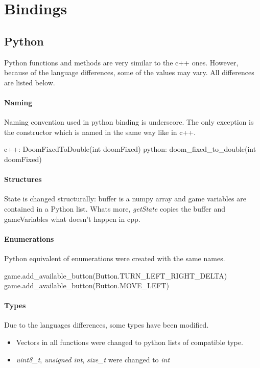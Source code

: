 \documentclass[english,bachelor,a4paper,twoside]{ppfcmthesis}
\begin{document}
\section{Bindings}
\subsection{Python}

Python functions and methods are very similar to the c++ ones. However, because of the language differences, some of the values may vary. All differences are listed below.

\paragraph {Naming}
Naming convention used in python binding is underscore. The only exception is the constructor which is named in the same way like in c++.

\begin{cblock}
c++: DoomFixedToDouble(int doomFixed)
python: doom_fixed_to_double(int doomFixed)
\end{cblock}


\paragraph {Structures}
 State is changed structurally: buffer is a numpy array and game variables are contained in a Python list. Whats more, \emph{getState} copies the buffer and gameVariables what doesn't happen in cpp. 
\paragraph {Enumerations}
Python equivalent of enumerations were created with the same names.
\begin{cblock}
game.add_available_button(Button.TURN_LEFT_RIGHT_DELTA)
game.add_available_button(Button.MOVE_LEFT)
\end{cblock}
\paragraph {Types}
Due to the languages differences, some types have been modified.
\begin{itemize} 
\item Vectors in all functions were changed to python lists of compatible type.

\item  \emph{uint8\_t}, \emph{unsigned int}, \emph{size\_t} were changed to \emph{int}
\end{itemize}
\end{document}
